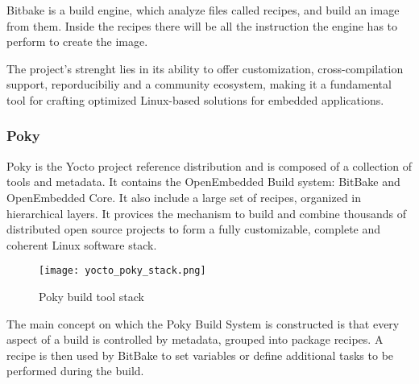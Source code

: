 Bitbake is a build engine, which analyze files called recipes, and build an
image from them. Inside the recipes there will be all the instruction the
engine has to perform to create the image.

The project's strenght lies in its ability to offer customization,
cross-compilation support, reporducibiliy and a community ecosystem, making it
a fundamental tool for crafting optimized Linux-based solutions for embedded
applications.

\subsubsection{Poky}

Poky is the Yocto project reference distribution and is composed of a
collection of tools and metadata.
It contains the OpenEmbedded Build system: BitBake and OpenEmbedded Core.
It also include a large set of recipes, organized in hierarchical layers.
It provices the mechanism to build and combine thousands of distributed open
source projects to form a fully customizable, complete and coherent Linux
software stack. \cite{salvador2014embedded}

\begin{figure}[ht]
    \centering
    \texttt{[image: yocto\_poky\_stack.png]}
    \caption{Poky build tool stack}
\end{figure}

The main concept on which the Poky Build System is constructed is that every
aspect of a build is controlled by metadata, grouped into package recipes.
A recipe is then used by BitBake to set variables or define additional tasks to
be performed during the build.
